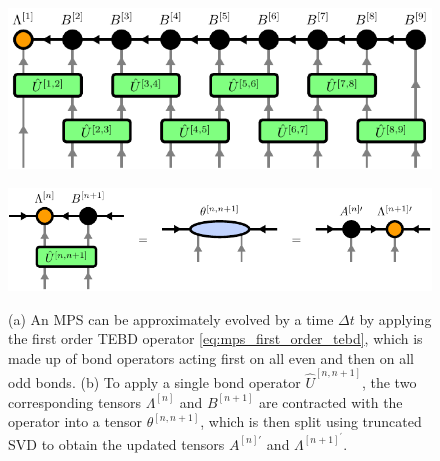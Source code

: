 \begin{figure}
	\centering
	\subcaptionbox{\label{fig:mps_tebd_first_order_overview}}
	{%
		\includegraphics[scale=1]{figures/tikz/Tensor_Networks/mps_TEBD/mps_TEBD_a.pdf}
	}
	\par\medskip
	\subcaptionbox{\label{fig:mps_tebd_first_order_applying_bond_op}}
	{%
		\includegraphics[scale=1]{figures/tikz/Tensor_Networks/mps_TEBD/mps_TEBD_b.pdf}
	}
	\caption{(a) An MPS can be approximately evolved by a time $\Delta t$ by applying the first order TEBD operator \eqref{eq:mps_first_order_tebd}, which is made up of bond operators acting first on all even and then on all odd bonds. (b) To apply a single bond operator $\hat{U}^{[n, n+1]}$, the two corresponding tensors $\Lambda^{[n]}$ and $B^{[n+1]}$ are contracted with the operator into a tensor $\theta^{[n,n+1]}$, which is then split using truncated SVD to obtain the updated tensors $A^{[n]\prime}$ and $\Lambda^{[n+1]^\prime}$.}
	\label{fig:mps_tebd_first_order}
\end{figure}